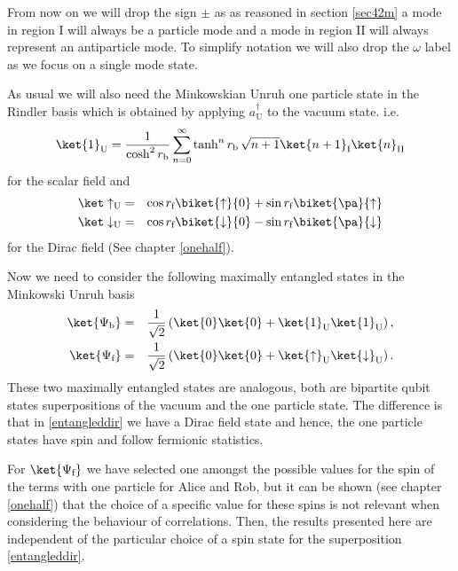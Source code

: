 From now on we will drop the sign $\pm$ as as reasoned in section \ref{sec42m} a mode in region I will always be a particle mode and a mode in region $\text{II}$ will always represent an antiparticle mode. To simplify notation we will also drop the $\omega$ label as we focus on a single mode state.

As usual we will also need the Minkowskian Unruh one particle state in the Rindler basis which is obtained by applying $a^\dagger_{\text{U}}$ to the vacuum state. i.e. 
\begin{equation}
\ket{1}_\text{U}=\frac{1}{\cosh^2 r_\text{b}}\sum_{n=0}^\infty \tanh^n r_\text{b} \,\sqrt{n+1}\ket{n+1}_\text{I}\ket{n}_{\text{II}}
\end{equation} 	
for the scalar field \cite{Alicefalls} and 
\begin{eqnarray}\label{onepart2}
\nonumber\ket\uparrow_\text{U}&=&\cos r_\text{f} \biket{\uparrow}{0}+\sin r_\text{f}\biket{\pa}{\uparrow}\\*
\ket\downarrow_\text{U}&=&\cos r_\text{f} \biket{\downarrow}{0}-\sin r_\text{f}\biket{\pa}{\downarrow}
\end{eqnarray}
for the Dirac field (See chapter \ref{onehalf}).

Now we need to consider the following maximally entangled states in the Minkowski Unruh basis
\begin{eqnarray}
\label{entangledsca}\ket{\Psi_\text{b}}&=&\frac{1}{\sqrt{2}}\left(\ket{0}\ket{0}+\ket{1}_\text{U}\ket{1}_\text{U}\right),\\*
\label{entangleddir}\ket{\Psi_\text{f}}&=&\frac{1}{\sqrt{2}}\left(\ket{0}\ket{0}+\ket{\uparrow}_\text{U}\ket{\downarrow}_\text{U}\right).
\end{eqnarray}
These two maximally entangled states are analogous, both are bipartite qubit states superpositions of the vacuum and the one particle state. The difference is that in \eqref{entangleddir} we have a Dirac field state and hence, the one particle states have spin and follow fermionic statistics.

For $\ket{\Psi_\text{f}}$ we have selected one amongst the possible values for the spin of the terms with one particle for Alice and Rob, but it can be shown (see chapter \ref{onehalf}) that the choice of a specific value for these spins is not relevant when considering the behaviour of correlations. Then, the results presented here are independent of the particular choice of a spin state for the superposition \eqref{entangleddir}.



